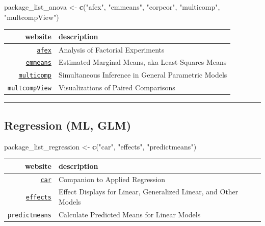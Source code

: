 \documentclass[]{book}
\newenvironment{Shaded}{\begin{snugshade}}{\end{snugshade}}
\newcommand{\KeywordTok}[1]{\textcolor[rgb]{0.13,0.29,0.53}{\textbf{#1}}}
\newcommand{\StringTok}[1]{\textcolor[rgb]{0.31,0.60,0.02}{#1}}
\newcommand{\NormalTok}[1]{#1}
\theoremstyle{definition}
\theoremstyle{definition}
\theoremstyle{definition}
\theoremstyle{remark}
\begin{document}
\begin{Shaded}
\begin{Highlighting}[]
\NormalTok{package_list_anova <-}\StringTok{ }\KeywordTok{c}\NormalTok{(}\StringTok{"afex"}\NormalTok{,}
                        \StringTok{"emmeans"}\NormalTok{, }
                        \StringTok{"corpcor"}\NormalTok{,}
                        \StringTok{"multicomp"}\NormalTok{, }
                        \StringTok{"multcompView"}\NormalTok{)}
\end{Highlighting}
\end{Shaded}

\begin{longtable}[]{@{}rl@{}}
\toprule
website & description\tabularnewline
\midrule
\endhead
\href{https://github.com/singmann/afex}{\texttt{afex}} & Analysis of
Factorial Experiments\tabularnewline
\href{https://github.com/rvlenth/emmeans}{\texttt{emmeans}} & Estimated
Marginal Means, aka Least-Squares Means\tabularnewline
\href{http://multcomp.r-forge.r-project.org/}{\texttt{multicomp}} &
Simultaneous Inference in General Parametric Models\tabularnewline
\texttt{multcompView} & Visualizations of Paired
Comparisons\tabularnewline
\bottomrule
\end{longtable}

\begin{center}\rule{0.5\linewidth}{\linethickness}\end{center}

\subsection{Regression (ML, GLM)}\label{regression-ml-glm}

\begin{Shaded}
\begin{Highlighting}[]
\NormalTok{package_list_regression <-}\StringTok{ }\KeywordTok{c}\NormalTok{(}\StringTok{"car"}\NormalTok{,}
                             \StringTok{"effects"}\NormalTok{,}
                             \StringTok{"predictmeans"}\NormalTok{)}
\end{Highlighting}
\end{Shaded}

\begin{longtable}[]{@{}rl@{}}
\toprule
website & description\tabularnewline
\midrule
\endhead
\href{https://www.statmethods.net/stats/rdiagnostics.html}{\texttt{car}}
& Companion to Applied Regression\tabularnewline
\href{https://www.jstatsoft.org/article/view/v008i15/effect-displays-revised.pdf}{\texttt{effects}}
& Effect Displays for Linear, Generalized Linear, and Other
Models\tabularnewline
\texttt{predictmeans} & Calculate Predicted Means for Linear
Models\tabularnewline
\bottomrule
\end{longtable}
\end{document}
